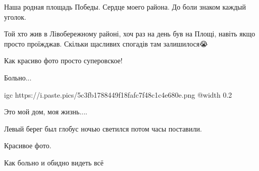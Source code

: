 
Наша родная площадь Победы. Сердце моего района. До боли знаком каждый уголок.


Той хто жив в Лівобережному районі, хоч раз на день був на Площі, навіть якщо
просто проїжджав. Скільки щасливих спогадів там залишилося😭


Как красиво фото просто суперовское!


Больно...


\ifcmt
  igc https://i.paste.pics/5c3fb1788449f18fafc7f48c1c4e680e.png
	@width 0.2
\fi


Это мой дом, моя жизнь....


Левый берег был глобус ночью светился потом часы поставили.


Красивое фото.


Как больно и обидно видеть всё
